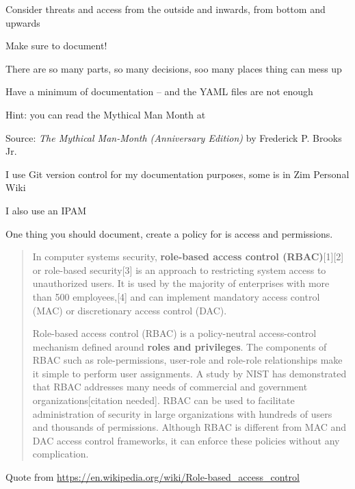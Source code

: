\documentclass[Screen16to9,17pt]{foils}
\begin{document}
Consider threats and access from the outside and inwards, from bottom and upwards




\begin{list2}
\item Make sure to document!
\item There are so many parts, so many decisions, soo many places thing can mess up
\item Have a minimum of documentation -- and the YAML files are not enough
\item Hint:  you can read the Mythical Man Month at 
\end{list2}


Source: \emph{The Mythical Man-Month (Anniversary Edition)}
by Frederick P. Brooks Jr.

\begin{list2}
\item I use Git version control for my documentation purposes, some is in Zim Personal Wiki 
\item I also use an IPAM 
\end{list2}


One thing you should document, create a policy for is access and permissions.

\begin{quote}
In computer systems security, {\bf role-based access control (RBAC)}[1][2] or role-based security[3] is an approach to restricting system access to unauthorized users. It is used by the majority of enterprises with more than 500 employees,[4] and can implement mandatory access control (MAC) or discretionary access control (DAC).

Role-based access control (RBAC) is a policy-neutral access-control mechanism defined around {\bf roles and privileges}. The components of RBAC such as role-permissions, user-role and role-role relationships make it simple to perform user assignments. A study by NIST has demonstrated that RBAC addresses many needs of commercial and government organizations[citation needed]. RBAC can be used to facilitate administration of security in large organizations with hundreds of users and thousands of permissions. Although RBAC is different from MAC and DAC access control frameworks, it can enforce these policies without any complication.
\end{quote}
Quote from \url{https://en.wikipedia.org/wiki/Role-based_access_control}
\end{document}

